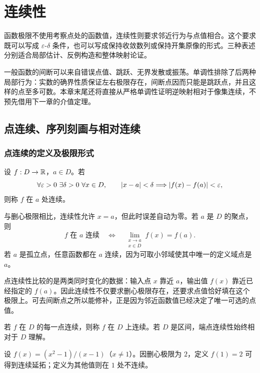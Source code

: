 \chapter{连续性}
\label{chap:continuity-discontinuity}

函数极限不使用考察点处的函数值，连续性则要求邻近行为与点值相合。这个要求既可以写成 \(\varepsilon\)-\(\delta\) 条件，也可以写成保持收敛数列或保持开集原像的形式。三种表述分别适合局部估计、反例构造和整体映射论证。

一般函数的间断可以来自错误点值、跳跃、无界发散或振荡。单调性排除了后两种局部行为：实数的确界性质保证左右极限存在，间断点因而只能是跳跃点，并且这样的点至多可数。本章末尾还将直接从严格单调性证明逆映射相对于像集连续，不预先借用下一章的介值定理。

\section{点连续、序列刻画与相对连续}

\subsection{点连续的定义及极限形式}


\begin{definition}[点连续]
设 \(f:D\to\mathbb{R}\)，\(a\in D\)。若
\[
 \forall\varepsilon>0\ \exists\delta>0\ \forall x\in D,\qquad
 \abs{x-a}<\delta\Longrightarrow\abs{f(x)-f(a)}<\varepsilon,
\]
则称 \(f\) 在 \(a\) 处连续。
\end{definition}

与删心极限相比，连续性允许 \(x=a\)，但此时误差自动为零。若 \(a\) 是 \(D\) 的聚点，则
\[
 f\text{ 在 }a\text{ 连续}
 \quad\Longleftrightarrow\quad
 \lim_{\substack{x\to a\\x\in D}}f(x)=f(a).
\]
若 \(a\) 是孤立点，任意函数都在 \(a\) 连续，因为可取小邻域使其中唯一的定义域点是 \(a\)。

点连续性比较的是两类同时变化的数据：输入点 \(x\) 靠近 \(a\)，输出值 \(f(x)\) 靠近已经指定的 \(f(a)\)。因此连续性不仅要求删心极限存在，还要求点值恰好填在这个极限上。可去间断点之所以能修补，正是因为邻近函数值已经决定了唯一可选的点值。

\begin{definition}[集合上的连续性]
若 \(f\) 在 \(D\) 的每一点连续，则称 \(f\) 在 \(D\) 上连续。若 \(D\) 是区间，端点连续性始终相对于 \(D\) 理解。
\end{definition}

\begin{example}[可去补值]
设 \(f(x)=(x^2-1)/(x-1)\)（\(x\ne1\)）。因删心极限为 \(2\)，定义 \(f(1)=2\) 可得到连续延拓；定义为其他值则在 \(1\) 处不连续。
\end{example}

